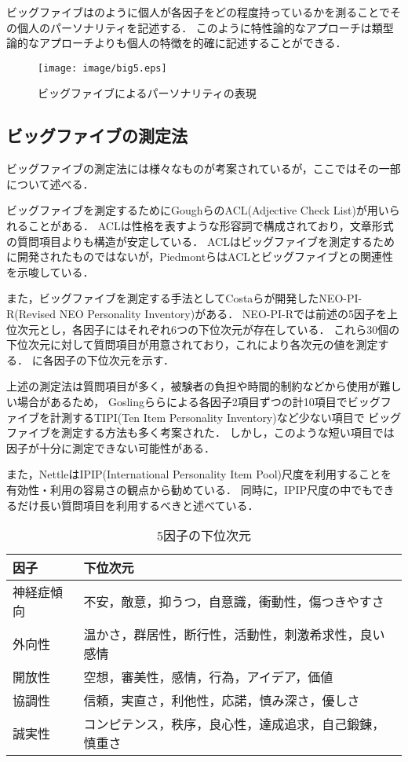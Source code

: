 ビッグファイブはのように個人が各因子をどの程度持っているかを測ることでその個人のパーソナリティを記述する．
このように特性論的なアプローチは類型論的なアプローチよりも個人の特徴を的確に記述することができる．

\begin{figure}[htb]
    \centering
    \texttt{[image: image/big5.eps]}
    \caption{ビッグファイブによるパーソナリティの表現}
    \label{fig:big5}
\end{figure}

\subsection{ビッグファイブの測定法}
ビッグファイブの測定法には様々なものが考案されているが，ここではその一部について述べる．

ビッグファイブを測定するためにGoughら\cite{acl}のACL(Adjective Check List)が用いられることがある．
ACLは性格を表すような形容詞で構成されており，文章形式の質問項目よりも構造が安定している．
ACLはビッグファイブを測定するために開発されたものではないが，Piedmontら\cite{big5-acl}はACLとビッグファイブとの関連性を示唆している．

また，ビッグファイブを測定する手法としてCostaら\cite{mccrae-1992, neo-pi-r}が開発したNEO-PI-R(Revised NEO Personality Inventory)がある．
NEO-PI-Rでは前述の5因子を上位次元とし，各因子にはそれぞれ6つの下位次元が存在している．
これら30個の下位次元に対して質問項目が用意されており，これにより各次元の値を測定する．
に各因子の下位次元を示す．

上述の測定法は質問項目が多く，被験者の負担や時間的制約などから使用が難しい場合があるため，
Goslingら\cite{tipi}らによる各因子2項目ずつの計10項目でビッグファイブを計測するTIPI(Ten Item Personality Inventory)など少ない項目で
ビッグファイブを測定する方法も多く考案された．
しかし，このような短い項目では因子が十分に測定できない可能性がある．

また，Nettle\cite{daniel}はIPIP(International Personality Item Pool)尺度を利用することを有効性・利用の容易さの観点から勧めている．
同時に，IPIP尺度の中でもできるだけ長い質問項目を利用するべきと述べている．

\begin{table}[htb]
    \centering
    \caption{5因子の下位次元}
    \begin{tabular}{ll} \hline
        因子 & 下位次元 \\ \hline
        神経症傾向 & 不安，敵意，抑うつ，自意識，衝動性，傷つきやすさ \\
        外向性 & 温かさ，群居性，断行性，活動性，刺激希求性，良い感情 \\
        開放性 & 空想，審美性，感情，行為，アイデア，価値 \\
        協調性 & 信頼，実直さ，利他性，応諾，慎み深さ，優しさ \\
        誠実性 & コンピテンス，秩序，良心性，達成追求，自己鍛錬，慎重さ \\ \hline
    \end{tabular}
    \label{tab:neo-pi-r}
\end{table}

